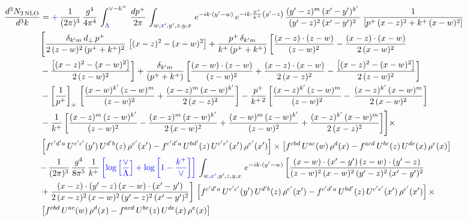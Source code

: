 \documentclass[9pt]{article}
\numberwithin{equation}{section}
\begin{document}
\begin{align}
 \frac{d^{3}N_{2\,\rm NLO}}{d^{3}k} & = {\color{blue}+}\, \frac{1}{(2\pi)^{3}}\,\frac{g^{4}}{4\pi^{4}}\,\int_{{\color{blue}\Lambda}}^{\vee-k^{+}}\, \frac{dp^{+}}{2\pi}\,\int_{w,{\color{blue}x'},y',z,y,x}\, e^{-ik\cdot (y'-w)}\,e^{-ik\cdot \frac{p^{+}}{k^{+}}\left(y'-z\right)}\, \frac{(y'-z)^{m}\,(x'-y')^{k'}\,}{(y'-z)^{2}\,(x'-y')^{2}\,}\, \frac{1}{\left[p^{+}\,(x-z)^{2}+k^{+}\,(x-w)^{2}\right]}\notag \\ & \Bigg[\frac{\delta_{k'm}\,d_{\perp}\,p^{+}}{2\,(z-w)^{2}\,(p^{+}+k^{+})^{2}}\, \left[(x-z)^{2}-(x-w)^{2}\right]+\frac{p^{+}\,\delta_{k'm}}{k^{+}\,(p^{+}+k^{+})}\,\bigg[\frac{(x-z)\cdot (z-w)}{(z-w)^{2}} -\frac{(x-z)\cdot (x-w)}{2\,(x-w)^{2}}\notag \\ & -\frac{\left[(x-z)^{2}-(x-w)^{2}\right]}{2\,(z-w)^{2}}\bigg] +\frac{\delta_{k'm}}{(p^{+}+k^{+})}\,\bigg[\frac{(x-w)\cdot (z-w)}{(z-w)^{2}}+\frac{(x-z)\cdot (x-w)}{2\,(x-z)^{2}} -\frac{\left[(x-z)^{2}-(x-w)^{2}\right]}{2\,(z-w)^{2}}\bigg]\notag \\ & -\left[\frac{1}{p^{+}}\right]_{+}\,\bigg[\frac{(x-w)^{k'}\,(z-w)^{m}}{(z-w)^{2}}+\frac{(x-z)^{m}\,(x-w)^{k'}}{2\,(x-z)^{2}}\bigg]-\frac{p^{+}}{k^{+\,2}}\,\bigg[\frac{(x-z)^{k'}\,(z-w)^{m}}{(z-w)^{2}} -\,\frac{(x-z)^{k'}\,(x-w)^{m}}{2\,(x-w)^{2}}\bigg]\notag \\ & -\frac{1}{k^{+}}\,\bigg[\frac{(x-z)^{m}\,(z-w)^{k'}}{(z-w)^{2}}-\frac{(x-z)^{m}\,(x-w)^{k'}}{2\,(x-w)^{2}}+\frac{(x-w)^{m}\,(z-w)^{k'}}{(z-w)^{2}} +\frac{(x-z)^{k'}\,(x-w)^{m}}{2\,(x-z)^{2}}\bigg]\Bigg]\times\,\notag \\ & \left[f^{c'd'a}\,U^{e'c'}(y')\,U^{d'b}(z)\,\rho^{e'}(x')-f^{c'd'a}\, 
    U^{bd'}(z)\,U^{c'e'}(x')\,\rho^{e'}(x')\right]\times \left[f^{cbd}\,U^{ac}(w)\,\rho^{d}(x) -f^{acd}\,U^{bc}(z)\,U^{de}(x)\,\rho^{e}(x)\right]\notag \\ &  {\color{blue}-}\, \frac{1}{(2\pi)^{3}}\,\frac{g^{4}}{8\pi^{5}}\,\frac{1}{k^{+}}\,{\color{blue}\left[\log{\left[\frac{\vee}{\Lambda}\right]}+\log{\left[1-\frac{k^{+}}{\vee}\right]}\right]}\,\int_{w,{\color{blue}x'},y',z,y,x}\, e^{-ik\cdot (y'-w)}\,\bigg[\frac{(x-w)\cdot (x'-y')\,(z-w)\cdot (y'-z)}{(z-w)^{2}\,(x-w)^{2}\,(y'-z)^{2}\,(x'-y')^{2}}\notag \\ & +\frac{(x-z)\cdot (y'-z)\,(x-w)\cdot (x'-y')}{2\,(x-z)^{2}\,(x-w)^{2}\,(y'-z)^{2}\,(x'-y')^{2}}\bigg]\, \left[f^{c'd'a}\,U^{e'c'}(y')\,U^{d'b}(z)\,\rho^{e'}(x')-f^{c'd'a}\, 
    U^{bd'}(z)\,U^{c'e'}(x')\,\rho^{e'}(x')\right]\times\notag \\ &  \left[f^{cbd}\,U^{ac}(w)\,\rho^{d}(x) -f^{acd}\,U^{bc}(z)\,U^{de}(x)\,\rho^{e}(x)\right] 
\end{align}
\end{document}

